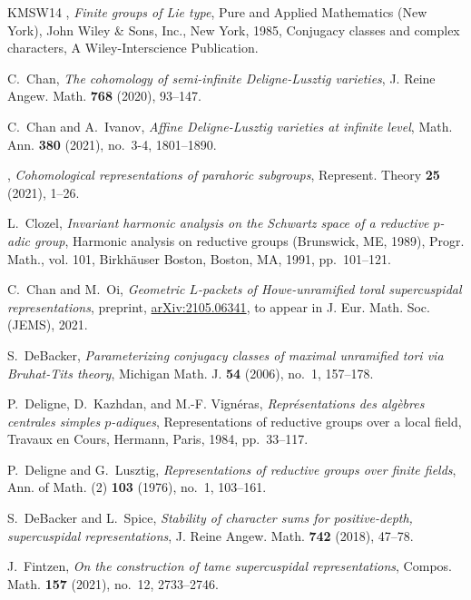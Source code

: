 \documentclass{amsart}
\theoremstyle{plain}
\theoremstyle{definition}
\theoremstyle{remark}
\theoremstyle{theorem}
\begin{document}
\begin{thebibliography}{KMSW14}
\bysame, \emph{Finite groups of {L}ie type}, Pure and Applied Mathematics (New
  York), John Wiley \& Sons, Inc., New York, 1985, Conjugacy classes and
  complex characters, A Wiley-Interscience Publication.

C.~Chan, \emph{The cohomology of semi-infinite {D}eligne-{L}usztig varieties},
  J. Reine Angew. Math. \textbf{768} (2020), 93--147.

C.~Chan and A.~Ivanov, \emph{Affine {D}eligne-{L}usztig varieties at infinite
  level}, Math. Ann. \textbf{380} (2021), no.~3-4, 1801--1890.

\bysame, \emph{Cohomological representations of parahoric subgroups},
  Represent. Theory \textbf{25} (2021), 1--26.

L.~Clozel, \emph{Invariant harmonic analysis on the {S}chwartz space of a
  reductive {$p$}-adic group}, Harmonic analysis on reductive groups
  ({B}runswick, {ME}, 1989), Progr. Math., vol. 101, Birkh\"{a}user Boston,
  Boston, MA, 1991, pp.~101--121.

C.~Chan and M.~Oi, \emph{Geometric {$L$}-packets of {H}owe-unramified toral
  supercuspidal representations}, preprint, \url{arXiv:2105.06341}, to appear
  in J. Eur. Math. Soc. (JEMS), 2021.

S.~DeBacker, \emph{Parameterizing conjugacy classes of maximal unramified tori
  via {B}ruhat-{T}its theory}, Michigan Math. J. \textbf{54} (2006), no.~1,
  157--178.

P.~Deligne, D.~Kazhdan, and M.-F. Vign\'{e}ras, \emph{Repr\'{e}sentations des
  alg\`ebres centrales simples {$p$}-adiques}, Representations of reductive
  groups over a local field, Travaux en Cours, Hermann, Paris, 1984,
  pp.~33--117.

P.~Deligne and G.~Lusztig, \emph{Representations of reductive groups over
  finite fields}, Ann. of Math. (2) \textbf{103} (1976), no.~1, 103--161.

S.~DeBacker and L.~Spice, \emph{Stability of character sums for positive-depth,
  supercuspidal representations}, J. Reine Angew. Math. \textbf{742} (2018),
  47--78.

J.~Fintzen, \emph{On the construction of tame supercuspidal representations},
  Compos. Math. \textbf{157} (2021), no.~12, 2733--2746.


\end{thebibliography}
\end{document}
